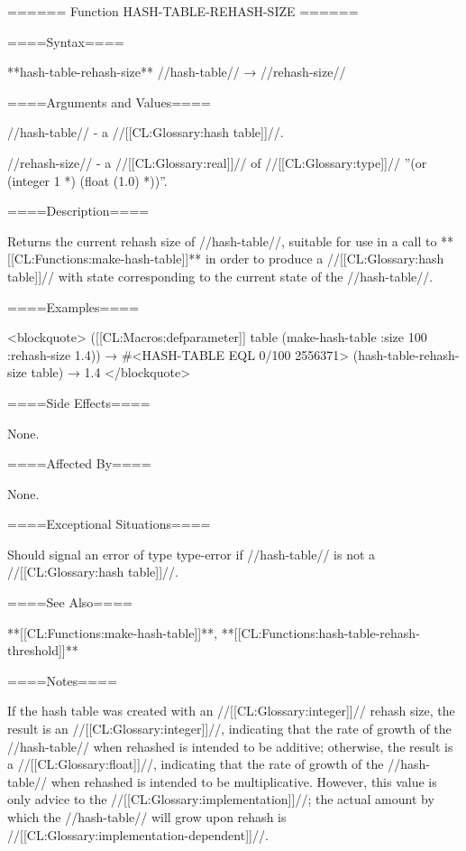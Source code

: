 ====== Function HASH-TABLE-REHASH-SIZE ======

====Syntax====

**hash-table-rehash-size** //hash-table// → //rehash-size//

====Arguments and Values====

//hash-table// - a //[[CL:Glossary:hash table]]//.

//rehash-size// - a //[[CL:Glossary:real]]// of //[[CL:Glossary:type]]// ''(or (integer 1 *) (float (1.0) *))''.

====Description====

Returns the current rehash size of //hash-table//, suitable for use in a call to **[[CL:Functions:make-hash-table]]** in order to produce a //[[CL:Glossary:hash table]]// with state corresponding to the current state of the //hash-table//.

====Examples====

<blockquote> ([[CL:Macros:defparameter]] table (make-hash-table :size 100 :rehash-size 1.4)) → #<HASH-TABLE EQL 0/100 2556371> (hash-table-rehash-size table) → 1.4 </blockquote>

====Side Effects====

None.

====Affected By====

None.

====Exceptional Situations====

Should signal an error of type type-error if //hash-table// is not a //[[CL:Glossary:hash table]]//.

====See Also====

**[[CL:Functions:make-hash-table]]**, **[[CL:Functions:hash-table-rehash-threshold]]**

====Notes====

If the hash table was created with an //[[CL:Glossary:integer]]// rehash size, the result is an //[[CL:Glossary:integer]]//, indicating that the rate of growth of the //hash-table// when rehashed is intended to be additive; otherwise, the result is a //[[CL:Glossary:float]]//, indicating that the rate of growth of the //hash-table// when rehashed is intended to be multiplicative. However, this value is only advice to the //[[CL:Glossary:implementation]]//; the actual amount by which the //hash-table// will grow upon rehash is //[[CL:Glossary:implementation-dependent]]//.

 
